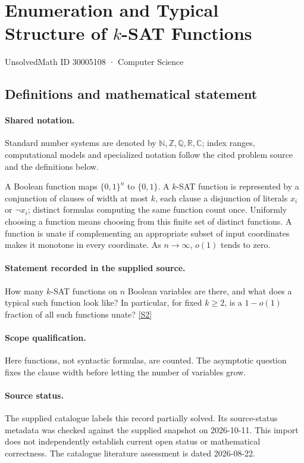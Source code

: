 \documentclass[11pt]{article}
\newcommand{\sref}[2]{\hyperlink{source:#1:#2}{[S#2]}}
\begin{document}
\setcounter{section}{30005107}
\section{Enumeration and Typical Structure of $k$-SAT Functions}\label{30005108}
{\small\sffamily UnsolvedMath ID 30005108 · Computer Science}
\subsection{Definitions and mathematical statement}

\paragraph{Shared notation.}Standard number systems are denoted by $\mathbb N,\mathbb Z,\mathbb Q,\mathbb R,\mathbb C$; index ranges, computational models and specialized notation follow the cited problem source and the definitions below.


A Boolean function maps $\{0,1\}^n$ to $\{0,1\}$. A $k$-SAT function is represented by a conjunction of clauses of width at most $k$, each clause a disjunction of literals $x_i$ or $\neg x_i$; distinct formulas computing the same function count once. Uniformly choosing a function means choosing from this finite set of distinct functions. A function is unate if complementing an appropriate subset of input coordinates makes it monotone in every coordinate. As $n\to\infty$, $o(1)$ tends to zero.
\paragraph{Statement recorded in the supplied source.}
How many $k$-SAT functions on $n$ Boolean variables are there, and what does a typical such function look like? In particular, for fixed $k\geq 2$, is a $1-o(1)$ fraction of all such functions unate? \sref{30005108}{2}
\paragraph{Scope qualification.}
Here functions, not syntactic formulas, are counted. The asymptotic question fixes the clause width before letting the number of variables grow.
\paragraph{Source status.}
The supplied catalogue labels this record partially solved. Its source-status metadata was checked against the supplied snapshot on 2026-10-11. This import does not independently establish current open status or mathematical correctness. The catalogue literature assessment is dated 2026-08-22.
\end{document}
